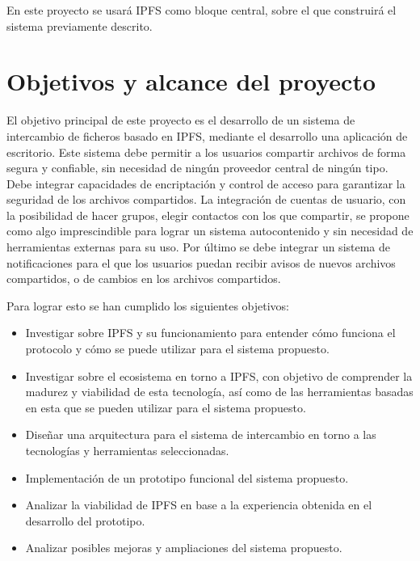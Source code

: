 En este proyecto se usará IPFS como bloque central, sobre el que construirá el sistema previamente descrito.


\section{Objetivos y alcance del proyecto}
El objetivo principal de este proyecto es el desarrollo de un sistema de intercambio de ficheros basado en IPFS, mediante el desarrollo una aplicación de escritorio.
Este sistema debe permitir a los usuarios compartir archivos de forma segura y confiable, sin necesidad de ningún proveedor
central de ningún tipo.
\\Debe integrar capacidades de encriptación y control de acceso para garantizar la seguridad de los
archivos compartidos. La integración de cuentas de usuario, con la posibilidad de hacer grupos, elegir contactos con los que
compartir, se propone como algo imprescindible para lograr un sistema autocontenido y sin necesidad de herramientas externas
para su uso. Por último se debe integrar un sistema de notificaciones para el que los usuarios puedan recibir avisos de nuevos
archivos compartidos, o de cambios en los archivos compartidos.

Para lograr esto se han cumplido los siguientes objetivos:
\begin{itemize}

      \item Investigar sobre IPFS y su funcionamiento para entender cómo funciona el protocolo
            y cómo se puede utilizar para el sistema propuesto.
      \item Investigar sobre el ecosistema en torno a IPFS, con objetivo de comprender
            la madurez y viabilidad de esta tecnología, así como de las herramientas basadas en esta
            que se pueden utilizar para el sistema propuesto.
      \item Diseñar una arquitectura para el sistema de intercambio en torno a las tecnologías y herramientas seleccionadas.
      \item Implementación de un prototipo funcional del sistema propuesto.
      \item Analizar la viabilidad de IPFS en base a la experiencia obtenida en el desarrollo del prototipo.
      \item Analizar posibles mejoras y ampliaciones del sistema propuesto.

\end{itemize}

